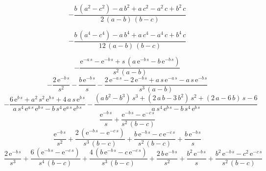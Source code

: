 \documentclass[]{article}
\begin{document}
\begin{equation}
 -\frac{b\, \left(a^2 - c^2\right) - a\, b^2 + a\, c^2 - a^2\, c + b^2\, 
  c}{2\, \left(a - b\right)\, \left(b - c\right)}
\end{equation}

\begin{equation}
-\frac{b\, \left(a^4 - c^4\right) - a\, b^4 + a\, c^4 - a^4\, c + b^4\, 
  c}{12\, \left(a - b\right)\, \left(b - c\right)}
  \label{}
\end{equation}

\begin{equation}
  -\frac{\mathrm{e}^{- a\, s} - \mathrm{e}^{- b\, s} + s\, \left(a\, 
  \mathrm{e}^{- b\, s} - b\, \mathrm{e}^{- b\, s}\right)}{s^2\, \left(a - 
  b\right)}
\end{equation}
\begin{equation}
  - \frac{2\, \mathrm{e}^{- b\, s}}{s^2} - \frac{b\, \mathrm{e}^{- b\, 
  s}}{s} - \frac{2\, \mathrm{e}^{- a\, s} - 2\, \mathrm{e}^{- b\, s} + a\, 
  s\, \mathrm{e}^{- a\, s} - a\, s\, \mathrm{e}^{- b\, s}}{s^3\, \left(a - 
  b\right)}
\end{equation}
\begin{equation}
  - \frac{6\, \mathrm{e}^{b\, s} + a^2\, s^2\, \mathrm{e}^{b\, s} + 4\, a\, 
  s\, \mathrm{e}^{b\, s}}{a\, s^4\, \mathrm{e}^{a\, s}\, \mathrm{e}^{b\, s} 
  - b\, s^4\, \mathrm{e}^{a\, s}\, \mathrm{e}^{b\, s}} - \frac{\left(a\, 
    b^2 - b^3\right)\, s^3 + \left(2\, a\, b - 3\, b^2\right)\, s^2 + 
  \left(2\, a - 6\, b\right)\, s - 6}{a\, s^4\, \mathrm{e}^{b\, s} - b\, 
  s^4\, \mathrm{e}^{b\, s}}
\end{equation}
\begin{equation}
  \frac{\mathrm{e}^{- b\, s}}{s} + \frac{\mathrm{e}^{- b\, s} - 
  \mathrm{e}^{- c\, s}}{s^2\, \left(b - c\right)}
\end{equation}
\begin{equation}
  \frac{\mathrm{e}^{- b\, s}}{s^2} + \frac{2\, \left(\mathrm{e}^{- b\, s} - 
  \mathrm{e}^{- c\, s}\right)}{s^3\, \left(b - c\right)} + \frac{b\, 
    \mathrm{e}^{- b\, s} - c\, \mathrm{e}^{- c\, s}}{s^2\, \left(b - 
    c\right)} + \frac{b\, \mathrm{e}^{- b\, s}}{s}
\end{equation}
\begin{equation}
  \frac{2\, \mathrm{e}^{- b\, s}}{s^3} + \frac{6\, \left(\mathrm{e}^{- b\, 
  s} - \mathrm{e}^{- c\, s}\right)}{s^4\, \left(b - c\right)} + \frac{4\, 
    \left(b\, \mathrm{e}^{- b\, s} - c\, \mathrm{e}^{- c\, s}\right)}{s^3\, 
    \left(b - c\right)} + \frac{2\, b\, \mathrm{e}^{- b\, s}}{s^2} + 
    \frac{b^2\, \mathrm{e}^{- b\, s}}{s} + \frac{b^2\, \mathrm{e}^{- b\, s} 
    - c^2\, \mathrm{e}^{- c\, s}}{s^2\, \left(b - c\right)}
\end{equation}
\end{document}
